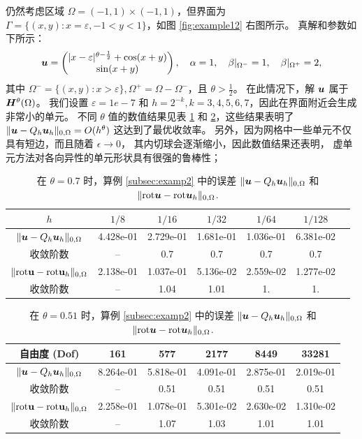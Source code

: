 仍然考虑区域
$\Omega=(-1, 1)\times(-1, 1)$，但界面为
$\Gamma = \{(x, y): x=\varepsilon, -1<y<1\}$，如图 \ref{fig:example12} 右图所示。
真解和参数如下所示：
$$
\boldsymbol{u} =
\begin{pmatrix}
|x-\varepsilon|^{\theta-\frac{1}{2}} + \cos(x + y) \\
\sin(x + y)
\end{pmatrix}, \quad \alpha = 1, \quad
\beta|_{\Omega^-} = 1, \quad \beta|_{\Omega^+} = 2,
$$
其中 $\Omega^- = \{(x, y): x > \varepsilon\}, \Omega^+ = \Omega - \Omega^-$，且 $\theta > \frac{1}{2}$。
在此情况下，解 $\boldsymbol{u}$ 属于 $\boldsymbol{H}^{\theta}(\Omega)$。
我们设置 $\varepsilon = 1e-7$ 和 $h = 2^{-k}, k = 3, 4, 5, 6,
7$，因此在界面附近会生成非常小的单元。
不同 $\theta$ 值的数值结果见表 \ref{tab:error1} 和
\ref{tab:error2}，这些结果表明了 
$\|\boldsymbol{u} - Q_h \boldsymbol{u}_h\|_{0,\Omega} = O(h^{\theta})$ 这达到了最优收敛率。
另外，因为网格中一些单元不仅具有短边，而且随着 $\epsilon \rightarrow 0$，
其内切球会逐渐缩小，因此数值结果还表明，
虚单元方法对各向异性的单元形状具有很强的鲁棒性；

\begin{table}[!h]
\centering
\caption{在 $\theta=0.7$ 时，算例 \ref{subsec:examp2} 中的误差 $\|\boldsymbol{u} - Q_h
\boldsymbol{u}_h\|_{0,\Omega}$ 和 $\|\mathrm{rot} \boldsymbol{u} - \mathrm{rot} \boldsymbol{u}_h\|_{0,\Omega}$.}
\label{tab:error1}
\begin{tabular}[c]{|c|c|c|c|c|c|c|}\hline
$h$ & $1/8$ & $1/16$ & $1/32$ & $1/64$ & $1/128$
\\\hline
$\| \boldsymbol{u} - Q_h\boldsymbol{u}_h\|_{0,\Omega}$ & 4.428e-01 & 2.729e-01 & 1.681e-01 & 1.036e-01 & 6.381e-02
\\\hline
收敛阶数 & -- & 0.7  & 0.7  & 0.7  & 0.7
\\\hline
$\|\mathrm{rot} {\bf u} - \mathrm{rot} {\bf u}_h\|_{0,\Omega}$ & 2.138e-01 & 1.037e-01 & 5.136e-02 & 2.559e-02 & 1.277e-02
\\\hline
收敛阶数 & -- & 1.04 & 1.01 & 1.   & 1.
\\\hline
\end{tabular}
\end{table}

\begin{table}[!h]
\centering
\caption{在 $\theta=0.51$ 时，算例 \ref{subsec:examp2} 中的误差 $\|\boldsymbol{u} - Q_h
\boldsymbol{u}_h\|_{0,\Omega}$ 和 $\|\mathrm{rot} \boldsymbol{u} - \mathrm{rot} \boldsymbol{u}_h\|_{0,\Omega}$.}
\label{tab:error2}
\begin{tabular}[c]{|c|c|c|c|c|c|}\hline
自由度 (Dof) &   161 &   577 &  2177 &  8449 & 33281
\\\hline
$\| \boldsymbol{u} - Q_h\boldsymbol{u}_h\|_{0,\Omega}$ & 8.264e-01 & 5.818e-01 & 4.091e-01 & 2.875e-01 & 2.019e-01
\\\hline
收敛阶数 & -- & 0.51 & 0.51 & 0.51 & 0.51
\\\hline
$\|\mathrm{rot} {\bf u} - \mathrm{rot} {\bf u}_h\|_{0,\Omega}$ & 2.258e-01 & 1.078e-01 & 5.301e-02 & 2.630e-02 & 1.310e-02
\\\hline
收敛阶数 & -- & 1.07 & 1.03 & 1.01 & 1.01
\\\hline
\end{tabular}
\end{table}

